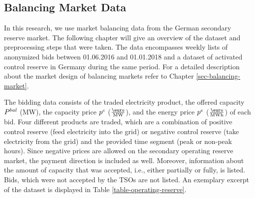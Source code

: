 \documentclass[a4paper, 12pt]{article}
\begin{document}
\subsection{Balancing Market Data \label{sec-data-balancing}}
\label{sec:org01c9fa3}
In this research, we use market balancing data from the German secondary reserve
market. The following chapter will give an overview of the dataset and
preprocessing steps that were taken. The data encompasses weekly lists of
anonymized bids between 01.06.2016 and 01.01.2018 and a dataset of activated
control reserve in Germany during the same period. For a detailed description
about the market design of balancing markets refer to Chapter
\ref{sec-balancing-market}.

The bidding data consists of the traded electricity product, the offered
capacity \(P^{bal}_{}\) (MW), the capacity price \(p^c_{}\) (\(\emw\)), and the
energy price \(p^e_{}\) (\(\emwh\)) of each bid. Four different products
are traded, which are a combination of positive control reserve (feed
electricity into the grid) or negative control reserve (take electricity from
the grid) and the provided time segment (peak or non-peak hours). Since negative
prices are allowed on the secondary operating reserve market, the payment
direction is included as well. Moreover, information about the amount of
capacity that was accepted, i.e., either partially or fully, is listed. Bids,
which were not accepted by the TSOs are not listed. An exemplary excerpt of the
dataset is displayed in Table \ref{table-operating-reserve}.
\end{document}
